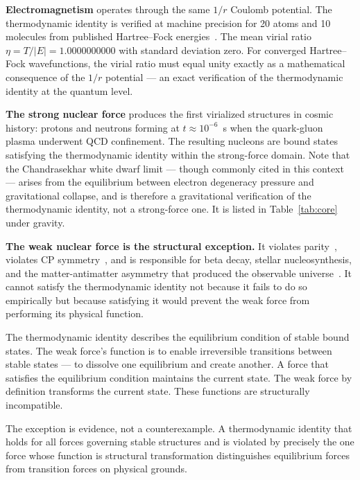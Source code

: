 \documentclass[12pt,a4paper]{article}
\begin{document}
\textbf{Electromagnetism} operates through the same $1/r$ Coulomb
potential. The thermodynamic identity is verified at machine precision for
20 atoms and 10 molecules from published Hartree--Fock
energies~\citep{Clementi1974,Bunge1993}. The mean virial ratio $\eta = T/|E| =
1.0000000000$ with standard deviation zero. For converged Hartree--Fock
wavefunctions, the virial ratio must equal unity exactly as a mathematical
consequence of the $1/r$ potential --- an exact verification of the
thermodynamic identity at the quantum level.

\textbf{The strong nuclear force} produces the first virialized structures
in cosmic history: protons and neutrons forming at $t \approx 10^{-6}$~s
when the quark-gluon plasma underwent QCD confinement. The resulting
nucleons are bound states satisfying the thermodynamic identity within
the strong-force domain. Note that the Chandrasekhar white dwarf limit
--- though commonly cited in this context --- arises from the equilibrium
between electron degeneracy pressure and gravitational collapse, and is
therefore a gravitational verification of the thermodynamic identity, not
a strong-force one. It is listed in Table~\ref{tab:core} under gravity.

\textbf{The weak nuclear force is the structural exception.} It violates
parity~\citep{Wu1957}, violates CP symmetry~\citep{Cronin1964}, and is
responsible for beta decay, stellar nucleosynthesis, and the
matter-antimatter asymmetry that produced the observable
universe~\citep{Sakharov1967}. It cannot satisfy the thermodynamic
identity not because it fails to do so empirically but because satisfying
it would prevent the weak force from performing its physical function.

The thermodynamic identity describes the equilibrium condition of stable
bound states. The weak force's function is to enable irreversible
transitions between stable states --- to dissolve one equilibrium and
create another. A force that satisfies the equilibrium condition maintains
the current state. The weak force by definition transforms the current
state. These functions are structurally incompatible.

The exception is evidence, not a counterexample. A thermodynamic identity
that holds for all forces governing stable structures and is violated by
precisely the one force whose function is structural transformation
distinguishes equilibrium forces from transition forces on physical
grounds.

\end{document}
